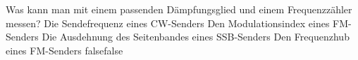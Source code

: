     {Was kann man mit einem passenden Dämpfungsglied und einem Frequenzzähler messen?}
    {Die Sendefrequenz eines CW-Senders}
    {Den Modulationsindex eines FM-Senders}
    {Die Ausdehnung des Seitenbandes eines SSB-Senders}
    {Den Frequenzhub eines FM-Senders}
    {false}{false}